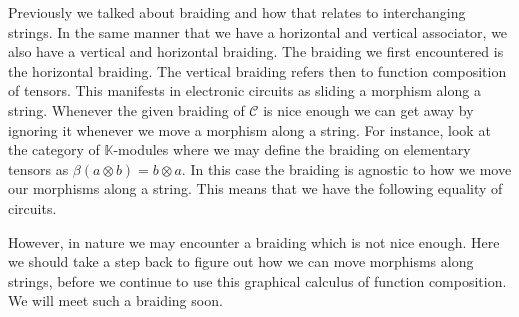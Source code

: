 \documentclass[../thesis.tex]{subfiles}
\begin{document}
            Previously we talked about braiding and how that relates to interchanging strings. In the same manner that we have a horizontal and vertical associator, we also have a vertical and horizontal braiding. The braiding we first encountered is the horizontal braiding. The vertical braiding refers then to function composition of tensors. This manifests in electronic circuits as sliding a morphism along a string. Whenever the given braiding of $\mathcal{C}$ is nice enough we can get away by ignoring it whenever we move a morphism along a string. For instance, look at the category of $\mathbb{K}$-modules where we may define the braiding on elementary tensors as $\beta (a\otimes b) = b\otimes a$. In this case the braiding is agnostic to how we move our morphisms along a string. This means that we have the following equality of circuits.
            \begin{center}
            \end{center}

            However, in nature we may encounter a braiding which is not nice enough. Here we should take a step back to figure out how we can move morphisms along strings, before we continue to use this graphical calculus of function composition. We will meet such a braiding soon.
            
\end{document}
